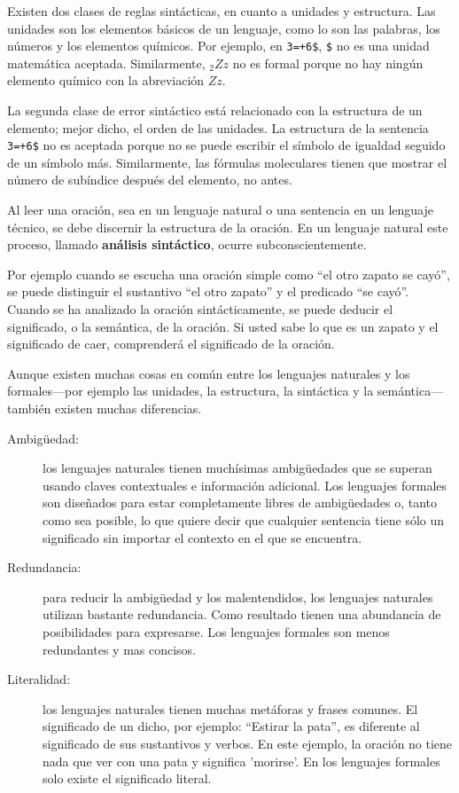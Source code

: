 Existen dos clases de reglas sintácticas, en cuanto a unidades y
estructura. Las unidades son los elementos básicos de un lenguaje,
como lo son las palabras, los números y los elementos químicos.
Por ejemplo, en \texttt{3=+6\$}, \texttt{\$} no es una unidad matemática
aceptada. Similarmente, $_2Zz$ no es formal porque no hay ningún
elemento químico con la abreviación $Zz$.

La segunda clase de error sintáctico está relacionado con la estructura
de un elemento; mejor dicho, el orden de las unidades. La estructura de
la sentencia \texttt{3=+6\$} no es aceptada porque no se puede escribir el
símbolo de igualdad seguido de un símbolo más. Similarmente, las 
fórmulas moleculares tienen que mostrar el número de subíndice después del 
elemento, no antes.

Al leer una oración, sea en un lenguaje natural o una sentencia
en un lenguaje técnico, se debe discernir la estructura de la
oración. En un lenguaje natural este proceso, llamado {\bf
análisis sintáctico}, ocurre subconscientemente.


Por ejemplo cuando se escucha una oración simple como ``el otro zapato
se cayó'', se puede
distinguir el sustantivo ``el otro zapato'' y el predicado ``se cayó''. Cuando se ha analizado la
oración sintácticamente, se puede deducir el significado, o la
semántica, de la oración. Si usted sabe lo que es un zapato y el significado
de caer, comprenderá el significado de la oración.

Aunque existen muchas cosas en común entre los lenguajes naturales y 
los formales---por ejemplo las unidades, la estructura,
la sintáctica y la semántica--- también existen muchas diferencias.


\begin{description}
\item[Ambigüedad:] los lenguajes naturales tienen muchísimas 
ambigüedades que se superan usando claves contextuales e información
adicional.
Los lenguajes formales son diseñados para estar completamente libres de
ambigüedades o, tanto como sea posible, lo que quiere decir que 
cualquier sentencia tiene sólo un significado sin importar el contexto
en el que se encuentra.

\item[Redundancia:] para reducir la ambigüedad y los malentendidos,
los lenguajes naturales utilizan bastante redundancia. Como resultado
tienen una abundancia de posibilidades para expresarse. Los lenguajes 
formales son menos redundantes y mas concisos.

\item[Literalidad:] los lenguajes naturales tienen muchas metáforas
y frases comunes. El significado de un dicho, por ejemplo: ``Estirar
la pata'', es diferente al significado de sus sustantivos y
verbos. En este ejemplo, la oración no tiene nada que ver con una
pata y significa 'morirse'. En los lenguajes formales solo existe el 
significado literal.

\end{description}

